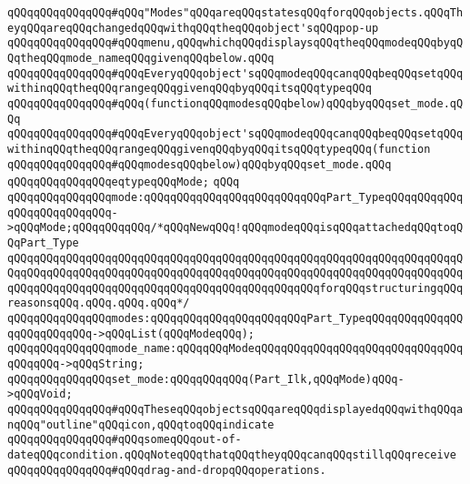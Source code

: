 \newline
\newline
\verb|qQQqqQQqqQQqqQQq#qQQq"Modes"qQQqareqQQqstatesqQQqforqQQqobjects.qQQqTheyqQQqareqQQqchangedqQQqwithqQQqtheqQQqobject'sqQQqpop-up|\newline
\verb|qQQqqQQqqQQqqQQq#qQQqmenu,qQQqwhichqQQqdisplaysqQQqtheqQQqmodeqQQqbyqQQqtheqQQqmode_nameqQQqgivenqQQqbelow.qQQq|\newline
\verb|qQQqqQQqqQQqqQQq#qQQqEveryqQQqobject'sqQQqmodeqQQqcanqQQqbeqQQqsetqQQqwithinqQQqtheqQQqrangeqQQqgivenqQQqbyqQQqitsqQQqtypeqQQq|\newline
\verb|qQQqqQQqqQQqqQQq#qQQq(functionqQQqmodesqQQqbelow)qQQqbyqQQqset_mode.qQQq|\newline
\verb|qQQqqQQqqQQqqQQq#qQQqEveryqQQqobject'sqQQqmodeqQQqcanqQQqbeqQQqsetqQQqwithinqQQqtheqQQqrangeqQQqgivenqQQqbyqQQqitsqQQqtypeqQQq(function|\newline
\verb|qQQqqQQqqQQqqQQq#qQQqmodesqQQqbelow)qQQqbyqQQqset_mode.qQQq|\newline
\newline
\verb|qQQqqQQqqQQqqQQqeqtypeqQQqMode;|\newline
\verb|qQQq|\newline
\verb|qQQqqQQqqQQqqQQqmode:qQQqqQQqqQQqqQQqqQQqqQQqqQQqPart_TypeqQQqqQQqqQQqqQQqqQQqqQQqqQQq->qQQqMode;qQQqqQQqqQQq/*qQQqNewqQQq!qQQqmodeqQQqisqQQqattachedqQQqtoqQQqPart_Type|\newline
\verb|qQQqqQQqqQQqqQQqqQQqqQQqqQQqqQQqqQQqqQQqqQQqqQQqqQQqqQQqqQQqqQQqqQQqqQQqqQQqqQQqqQQqqQQqqQQqqQQqqQQqqQQqqQQqqQQqqQQqqQQqqQQqqQQqqQQqqQQqqQQqqQQqqQQqqQQqqQQqqQQqqQQqqQQqqQQqqQQqqQQqqQQqqQQqforqQQqstructuringqQQqreasonsqQQq.qQQq.qQQq.qQQq*/|\newline
\verb|qQQqqQQqqQQqqQQqmodes:qQQqqQQqqQQqqQQqqQQqqQQqPart_TypeqQQqqQQqqQQqqQQqqQQqqQQqqQQq->qQQqList(qQQqModeqQQq);|\newline
\verb|qQQqqQQqqQQqqQQqmode_name:qQQqqQQqModeqQQqqQQqqQQqqQQqqQQqqQQqqQQqqQQqqQQqqQQq->qQQqString;|\newline
\verb|qQQqqQQqqQQqqQQqset_mode:qQQqqQQqqQQq(Part_Ilk,qQQqMode)qQQq->qQQqVoid;|\newline
\newline
\verb|qQQqqQQqqQQqqQQq#qQQqTheseqQQqobjectsqQQqareqQQqdisplayedqQQqwithqQQqanqQQq"outline"qQQqicon,qQQqtoqQQqindicate|\newline
\verb|qQQqqQQqqQQqqQQq#qQQqsomeqQQqout-of-dateqQQqcondition.qQQqNoteqQQqthatqQQqtheyqQQqcanqQQqstillqQQqreceive|\newline
\verb|qQQqqQQqqQQqqQQq#qQQqdrag-and-dropqQQqoperations.|\newline
